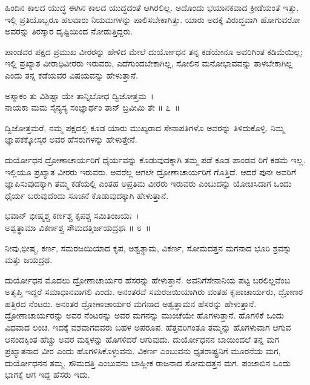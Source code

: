 ಹಿಂದಿನ ಕಾಲದ ಯುದ್ಧ ಈಗಿನ ಕಾಲದ ಯುದ್ಧದಂತೆ ಆಗಿರಲಿಲ್ಲ. ಅದೊಂದು ಭಯಾನಕವಾದ ಕ್ರೀಡೆಯಂತೆ ಇತ್ತು. ಇಲ್ಲಿ ಪ್ರತಿಯೊಬ್ಬರೂ ಹಲವಾರು ನಿಯಮಗಳನ್ನು ಪಾಲಿಸಬೇಕಾಗಿತ್ತು. ಯಾರು ಅದಕ್ಕೆ ವಿರುದ್ಧವಾಗಿ ಹೋಗುವರೋ ಅವರನ್ನು ತಿರಸ್ಕಾರ ದೃಷ್ಟಿಯಿಂದ ನೋಡುತ್ತಿದ್ದರು.

ಪಾಂಡವರ ಪಕ್ಷದ ಪ್ರಮುಖ ವೀರರನ್ನು ಹೇಳಿದ ಮೇಲೆ ದುರ್ಯೋಧನ ತನ್ನ ಕಡೆಯೇನೂ ಅವರಿಗಿಂತ ಕಡಿಮೆಯಿಲ್ಲ; ಇಲ್ಲಿ ಪ್ರಖ್ಯಾತ ವೀರಾಧಿವೀರರು ಇರುವರು, ಎದೆಗುಂದಬೇಕಾಗಿಲ್ಲ, ಸೋಲಿನ ಮನೋಭಾವವನ್ನು ತಾಳಬೇಕಾಗಿಲ್ಲ ಎಂದು ತನ್ನ ಕಡೆಯವರ ವಿಷಯವನ್ನು ಹೇಳುತ್ತಾನೆ.

\begin{shloka}
ಅಸ್ಮಾಕಂ ತು ವಿಶಿಷ್ಟಾ ಯೇ ತಾನ್ನಿಬೋಧ ದ್ವಿಜೋತ್ತಮ~।\\ನಾಯಕಾ ಮಮ ಸೈನ್ಯಸ್ಯ ಸಂಜ್ಞಾರ್ಥಂ ತಾನ್ ಬ್ರವೀಮಿ ತೇ \hfill॥ ೭~॥
\end{shloka}

\begin{artha}
ದ್ವಿಜೋತ್ತಮರೆ, ನಮ್ಮ ಪಕ್ಷದಲ್ಲಿ ಕೂಡ ಯಾರು ಮುಖ್ಯರಾದ ಸೇನಾಪತಿಗಳೊ ಅವರನ್ನು ತಿಳಿದುಕೊಳ್ಳಿ. ನಿಮ್ಮ ಜ್ಞಾಪಕಕ್ಕೋಸ್ಕರ ಅವರ ಹೆಸರುಗಳನ್ನು ಹೇಳುತ್ತೇನೆ.
\end{artha}

ದುರ್ಯೋಧನ ದ್ರೋಣಾಚಾರ್ಯರಿಗೆ ಧೈರ್ಯವನ್ನು ಕೊಡುವುದಕ್ಕಾಗಿ ತಮ್ಮ ಪಡೆ ಕೂಡ ಪಾಂಡವ ರಿಗೆ ಕಡಮೆ ಇಲ್ಲ. ಇಲ್ಲಿಯೂ ಪ್ರಖ್ಯಾತ ವೀರರು ಇರುವರು. ಅವರೆಲ್ಲ ಆಗಲೇ ದ್ರೋಣಾಚಾರ್ಯರಿಗೆ ಗೊತ್ತಿದೆ. ಆದರೆ ಪುನಃ ಅವರಿಗೆ ಜ್ಞಾಪಿಸುವುದಕ್ಕಾಗಿ ತಮ್ಮ ಕಡೆಯಲ್ಲಿ ಎಂತಹ ಅಪ್ರತಿಮ ವೀರರು ಇರುವರು ಎಂಬುದನ್ನು ಯೋಚಿಸಿದಾಗ ಒಂದು ಧೈರ್ಯ ಬರುವುದೆಂದು ಸೂಚನೆ ಕೊಡುವುದಕ್ಕಾಗಿ ಹೇಳುತ್ತಾನೆ.

\begin{shloka}
ಭವಾನ್ ಭೀಷ್ಮಶ್ಚ ಕರ್ಣಶ್ಚ ಕೃಪಶ್ಚ ಸಮಿತಿಂಜಯಃ~।\\ಅಶ್ವತ್ಥಾಮಾ ವಿಕರ್ಣಶ್ಚ ಸೌಮದತ್ತಿರ್ಜಯದ್ರಥಃ \hfill॥ ೮~॥
\end{shloka}

\newpage

\begin{artha}
ನೀವು,ಭೀಷ್ಮ, ಕರ್ಣ, ಸಮರಜಯಿಯಾದ ಕೃಪ, ಅಶ್ವತ್ಥಾಮ, ವಿಕರ್ಣ, ಸೋಮದತ್ತನ ಮಗನಾದ ಭೂರಿ ಶ್ರವಸ್ಸು ಮತ್ತು ಜಯದ್ರಥ.
\end{artha}

ದುರ್ಯೋಧನ ಮೊದಲು ದ್ರೋಣಾಚಾರ್ಯರ ಹೆಸರನ್ನು ಹೇಳುತ್ತಾನೆ. ಅವನಿಗೆ\break ಸೇನಾನಿಯ ಪಟ್ಟ ಬರಲಿಲ್ಲವೆಂಬ ಅತೃಪ್ತಿ ಇದ್ದರೆ ಸಮಾಧಾನವಾಗಲಿ ಎಂದು. ಅನಂತರವೆ ಸಮರಜಯಿಯಾಗಿರು ವಂತಹ ಕೃಪಾಚಾರ್ಯರು, ದ್ರೋಣರ ಹತ್ತಿರದ ನೆಂಟರು. ಅನಂತರ ದ್ರೋಣಾಚಾರ್ಯರ ಮಗನಾದ ಅಶ್ವತ್ಥಾಮನ ಹೆಸರನ್ನು ಹೇಳುತ್ತಾನೆ. ದ್ರೋಣಾಚಾರ್ಯರನ್ನು ಅವರ ನೆಂಟರನ್ನು ಅವರ ಮಗನನ್ನು ಮುಂಚೆಯೇ ಹೊಗಳುತ್ತಾನೆ. ಹೊಗಳಿಕೆ ಒಂದು ವಿಧವಾದ ಲಂಚ. ಇದಕ್ಕೆ ವಶವಾಗದವರು ಬಹಳ ಅಪರೂಪ. ಹೆತ್ತವರಿಗಂತೂ ತಮ್ಮನ್ನು ಹೊಗಳುವಾಗ ಆಗುವ ಆನಂದಕ್ಕಿಂತ ಹೆಚ್ಚು ಅವರ ಮಕ್ಕಳನ್ನು ಹೊಗಳಿದರೆ ಆಗುವುದು. ದುರ್ಯೋಧನನ ಬಾಯಿಂದಲೆ ತನ್ನ ಮಗ ಪ್ರಖ್ಯಾತನಾದ ವೀರ ಎಂದು ಹೊಗಳಿಸಿಕೊಳ್ಳುವನು. ವಿಕರ್ಣ ಎಂಬುವನು ಧೃತರಾಷ್ಟ್ರನಿಗೆ ಮೂರನೆಯ ಮಗ, ದುರ್ಯೋಧನನ ತಮ್ಮ. ಸೌಮದತ್ತಿ ಎಂಬುವನು ಬಾಹ್ಲೀಕ ರಾಜನಾದ ಸೋಮದತ್ತನ ಮಗ. ಪಂಜಾಬಿನ ಒಂದು ಭಾಗಕ್ಕೆ ಆಗ ಇದ್ದ ಹೆಸರು ಇದು.


